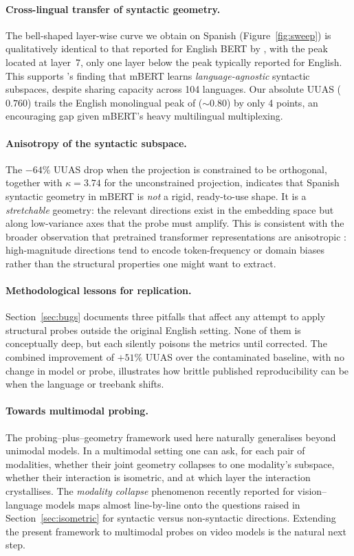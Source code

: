 \documentclass[11pt,a4paper]{article}
\newcommand{\layerbest}{7\xspace}
\begin{document}
\paragraph{Cross-lingual transfer of syntactic geometry.}
The bell-shaped layer-wise curve we obtain on Spanish
(Figure~\ref{fig:sweep}) is qualitatively identical to that reported
for English BERT by \citet{hewitt2019structural}, with the peak
located at layer~\layerbest, only one layer below the peak typically
reported for English. This supports
\citet{chi2020finding}'s finding that mBERT learns
\emph{language-agnostic} syntactic subspaces, despite sharing capacity
across 104 languages. Our absolute UUAS ($0.760$) trails the English
monolingual peak of \citet{hewitt2019structural} ($\sim 0.80$) by only
4 points, an encouraging gap given mBERT's heavy multilingual
multiplexing.

\paragraph{Anisotropy of the syntactic subspace.}
The $-64\%$ UUAS drop when the projection is constrained to be
orthogonal, together with $\kappa = 3.74$ for the unconstrained
projection, indicates that Spanish syntactic geometry in mBERT is
\emph{not} a rigid, ready-to-use shape. It is a \emph{stretchable}
geometry: the relevant directions exist in the embedding space but
along low-variance axes that the probe must amplify. This is
consistent with the broader observation that pretrained transformer
representations are anisotropic
\citep{ethayarajh2019contextual}: high-magnitude directions tend to
encode token-frequency or domain biases rather than the structural
properties one might want to extract.

\paragraph{Methodological lessons for replication.}
Section~\ref{sec:bugs} documents three pitfalls that affect any
attempt to apply structural probes outside the original English
setting. None of them is conceptually deep, but each silently
poisons the metrics until corrected. The combined improvement of
$+51\%$ UUAS over the contaminated baseline, with no change in model
or probe, illustrates how brittle published reproducibility can be
when the language or treebank shifts.

\paragraph{Towards multimodal probing.}
The probing--plus--geometry framework used here naturally generalises
beyond unimodal models. In a multimodal setting one can ask, for
each pair of modalities, whether their joint geometry collapses to
one modality's subspace, whether their interaction is
isometric, and at which layer the interaction crystallises. The
\emph{modality collapse} phenomenon recently reported for
vision--language models \citep{park2025modality, wang2025omnimmi}
maps almost line-by-line onto the questions raised in
Section~\ref{sec:isometric} for syntactic versus non-syntactic
directions. Extending the present framework to multimodal probes
on video models is the natural next step.
\end{document}
